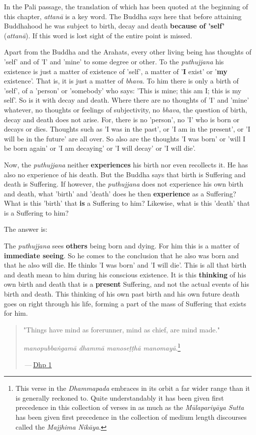 In the Pali passage, the translation of which has been quoted at the beginning of this chapter, \emph{attanā} is a key word. The Buddha says here that before attaining Buddhahood he was subject to birth, decay and death \textbf{because of 'self'} (\emph{attanā}). If this word is lost sight of the entire point is missed.

Apart from the Buddha and the Arahats, every other living being has thoughts of 'self' and of 'I' and 'mine' to some degree or other. To the \emph{puthujjana} his existence is just a matter of existence of 'self', a matter of '\textbf{I} exist' or '\textbf{my} existence'. That is, it is just a matter of \emph{bhava}. To him there is only a birth of 'self', of a 'person' or 'somebody' who says: 'This is mine; this am I; this is my self'. So is it with decay and death. Where there are no thoughts of 'I' and 'mine' whatever, no thoughts or feelings of subjectivity, no \emph{bhava}, the question of birth, decay and death does not arise. For, there is no 'person', no 'I' who is born or decays or dies. Thoughts such as 'I was in the past', or 'I am in the present', or 'I will be in the future' are all over. So also are the thoughts 'I was born' or 'will I be born again' or 'I am decaying' or 'I will decay' or 'I will die'.

Now, the \emph{puthujjana} neither \textbf{experiences} his birth nor even recollects it. He has also no experience of his death. But the Buddha says that birth is Suffering and death is Suffering. If however, the \emph{puthujjana} does not experience his own birth and death, what 'birth' and 'death' does he then \textbf{experience} as a Suffering? What is this 'birth' that \textbf{is} a Suffering to him? Likewise, what is this 'death' that is a Suffering to him?

The answer is:

The \emph{puthujjana} sees \textbf{others} being born and dying. For him this is a matter of \textbf{immediate seeing}. So he comes to the conclusion that he also was born and that he also will die. He thinks 'I was born' and 'I will die'. This is all that birth and death mean to him during his conscious existence. It is this \textbf{thinking} of his own birth and death that is a \textbf{present} Suffering, and not the actual events of his birth and death. This thinking of his own past birth and his own future death goes on right through his life, forming a part of the mass of Suffering that exists for him.

\begin{quote}
"Things have mind as forerunner, mind as chief, are mind made."

\emph{manopubbaṅgamā dhammā manoseṭṭhā manomayā}.\footnote{This verse in the \emph{Dhammapada} embraces in its orbit a far wider range than it is generally reckoned to. Quite understandably it has been given first precedence in this collection of verses in as much as the \emph{Mūlapariyāya Sutta} has been given first precedence in the collection of medium length discourses called the \emph{Majjhima Nikāya}.}

 --- \href{https://suttacentral.net/dhp1-20/en/anandajoti}{Dhp 1}
\end{quote}

